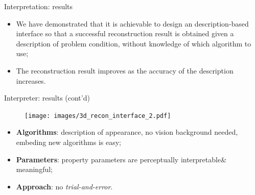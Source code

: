 \documentclass[10pt]{beamer}
\begin{document}
\begin{frame}{Interpretation: results}

\begin{exampleblock}{}
\begin{itemize}
\item We have demonstrated that it is achievable to design an description-based interface so that a successful reconstruction result is obtained given a description of problem condition, without knowledge of which algorithm to use;
\item The reconstruction result improves as the accuracy of the description increases.
\end{itemize}
\end{exampleblock}

\end{frame}

\begin{frame}{Interpreter: results (cont'd)}

\begin{figure}
\centering
\texttt{[image: images/3d\_recon\_interface\_2.pdf]}
\end{figure}

\begin{exampleblock}{}
  \begin{itemize}
    \item \textbf{Algorithms}: description of appearance, no vision background needed, embeding new algorithms is easy;
    \item \textbf{Parameters}: property parameters are perceptually interpretable\& meaningful;
    \item \textbf{Approach}: no \textit{trial-and-error}.
  \end{itemize}
\end{exampleblock}

\end{frame}

\end{document}
